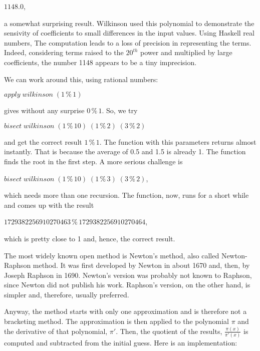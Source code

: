 \documentclass[tikz]{scrreprt}
\newcommand{\Varid}[1]{\mathit{#1}}
\begin{document}
\ensuremath{\mathrm{1148.0}},

a somewhat surprising result.
Wilkinson used this polynomial to demonstrate
the sensivity of coefficients to small differences
in the input values. Using Haskell real numbers,
The computation leads to a loss of precision
in representing the terms. Indeed, considering
terms raised to the $20^{th}$ power and multiplied
by large coefficients, the number 1148 appears to
be a tiny imprecision.

We can work around this, using rational numbers:

\ensuremath{\Varid{apply}\;\Varid{wilkinson}\;(\mathrm{1}\mathbin{\%}\mathrm{1})}

gives without any surprise \ensuremath{\mathrm{0}\mathbin{\%}\mathrm{1}}.
So, we try

\ensuremath{\Varid{bisect}\;\Varid{wilkinson}\;(\mathrm{1}\mathbin{\%}\mathrm{10})\;(\mathrm{1}\mathbin{\%}\mathrm{2})\;(\mathrm{3}\mathbin{\%}\mathrm{2})}

and get the correct result \ensuremath{\mathrm{1}\mathbin{\%}\mathrm{1}}.
The function with this parameters
returns almost instantly. That is
because the average of 0.5 and 1.5 is already 1.
The function finds the root in the first step.
A more serious challenge is

\ensuremath{\Varid{bisect}\;\Varid{wilkinson}\;(\mathrm{1}\mathbin{\%}\mathrm{10})\;(\mathrm{1}\mathbin{\%}\mathrm{3})\;(\mathrm{3}\mathbin{\%}\mathrm{2})},

which needs more than one recursion.
The function, now, runs for a short while and
comes up with the result

\ensuremath{\mathrm{1729382256910270463}\mathbin{\%}\mathrm{1729382256910270464}},

which is pretty close to 1 and, hence,
the correct result.

The most widely known open method is Newton's method,
also called Newton-Raphson method.
It was first developed by Newton in about 1670
and, then, by Joseph Raphson in 1690.
Newton's version was probably not known to Raphson,
since Newton did not publish his work.
Raphson's version, on the other hand, is
simpler and, therefore, usually preferred.

Anyway, the method starts with only one approximation
and is therefore not a bracketing method.
The approximation is then applied to the polynomial $\pi$
and the derivative of that polynomial, $\pi'$.
Then, the quotient of the results, $\frac{\pi(x)}{\pi'(x)}$ 
is computed and subtracted from the initial guess.
Here is an implementation:
\end{document}
